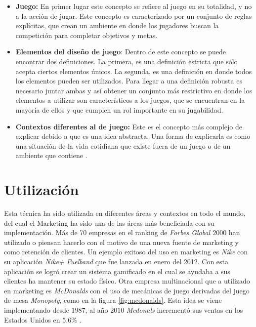 \begin{itemize}
    \item {\bf Juego:}
        En primer lugar este concepto se refiere al juego en su totalidad,
        y no a la acción de jugar.
        Este concepto es caracterizado por un conjunto de reglas explícitas,
        que crean un ambiente en donde los jugadores buscan la competición para
        completar objetivos y metas.

    \item {\bf Elementos del diseño de juego}:
        Dentro de este concepto se puede encontrar dos definiciones.
        La primera, es una definición estricta que sólo acepta ciertos elementos
        únicos.
        La segunda, es una definición en donde todos los elementos pueden ser
        utilizados.
        Para llegar a una definición robusta es necesario juntar ambas y así
        obtener un conjunto más restrictivo en donde los elementos a utilizar
        son característicos a los juegos, que se encuentran en la mayoría de ellos
        y que cumplen un rol importante en su jugabilidad.

    \item {\bf Contextos diferentes al de juego:}
        Este es el concepto más complejo de explicar debido a que es una idea
        abstracta.
        Una forma de explicarla es como una situación de la vida cotidiana
        que existe fuera de un juego o de un ambiente que contiene {\gam}.

\end{itemize}

\section{Utilización}

Esta técnica ha sido utilizada en diferentes áreas y contextos en todo el mundo,
del cual el Marketing ha sido una de las áreas más beneficiada con su
implementación.
Más de 70 empresas en el ranking de \emph{Forbes Global $2000$} han utilizado o
piensan hacerlo con el motivo de una nueva fuente de marketing y como retención
de clientes\cite{Gam:Util:1}.
Un ejemplo exitoso del uso en marketing es \emph{Nike} con su aplicación
\emph{Nike+ Fuelband} que fue lanzada en enero del 2012\cite{Gam:Util:2}.
Con esta aplicación se logró crear un sistema gamificado en el cual se ayudaba
a sus clientes ha mantener su estado físico.
Otra empresa multinacional que a utilizado {\gam} en marketing es \emph{McDonalds}
con el uso de mecánicas de juego derivadas del juego de mesa \emph{Monopoly}, como
en la figura \ref{fig:mcdonalds}.
Esta idea se viene implementando desde $1987$, al año $2010$
\emph{Mcdonals} incrementó sus ventas en los Estados Unidos en $5.6\%$
\cite{Gam:Util:2}.

